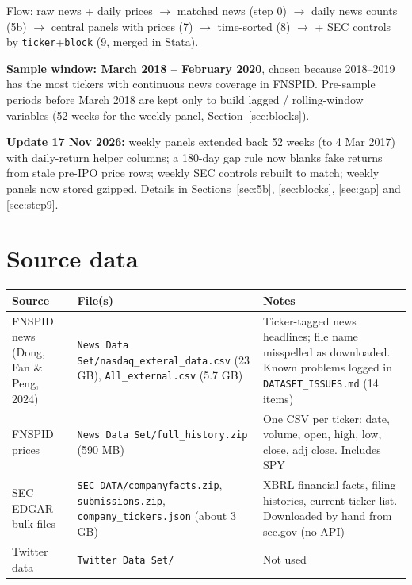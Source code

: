 \documentclass[11pt]{article}
\newcommand{\var}[1]{\texttt{#1}}
\begin{document}
Flow: raw news + daily prices $\rightarrow$ matched news (step 0) $\rightarrow$ daily news counts (5b) $\rightarrow$ central panels with prices (7) $\rightarrow$ time-sorted (8) $\rightarrow$ + SEC controls by \var{ticker}+\var{block} (9, merged in Stata).

\textbf{Sample window: March 2018 -- February 2020}, chosen because 2018--2019 has the most tickers with continuous news coverage in FNSPID. Pre-sample periods before March 2018 are kept only to build lagged / rolling-window variables (52 weeks for the weekly panel, Section~\ref{sec:blocks}).

\textbf{Update 17 Nov 2026:} weekly panels extended back 52 weeks (to 4 Mar 2017) with daily-return helper columns; a 180-day gap rule now blanks fake returns from stale pre-IPO price rows; weekly SEC controls rebuilt to match; weekly panels now stored gzipped. Details in Sections~\ref{sec:5b}, \ref{sec:blocks}, \ref{sec:gap} and \ref{sec:step9}.

\section{Source data}

\begin{center}\small
\begin{tabularx}{\textwidth}{@{}>{\raggedright\arraybackslash}p{3.2cm} >{\raggedright\arraybackslash}p{5.2cm} L@{}}
\toprule
Source & File(s) & Notes\\
\midrule
FNSPID news (Dong, Fan \& Peng, 2024) & \var{News Data Set/nasdaq\_exteral\_data.csv} (23 GB), \var{All\_external.csv} (5.7 GB) & Ticker-tagged news headlines; file name misspelled as downloaded. Known problems logged in \var{DATASET\_ISSUES.md} (14 items)\\
FNSPID prices & \var{News Data Set/full\_history.zip} (590 MB) & One CSV per ticker: date, volume, open, high, low, close, adj close. Includes SPY\\
SEC EDGAR bulk files & \var{SEC DATA/companyfacts.zip}, \var{submissions.zip}, \var{company\_tickers.json} (about 3 GB) & XBRL financial facts, filing histories, current ticker list. Downloaded by hand from sec.gov (no API)\\
Twitter data & \var{Twitter Data Set/} & Not used\\
\bottomrule
\end{tabularx}
\end{center}
\end{document}
